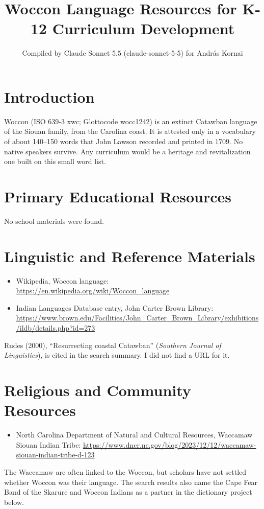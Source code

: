 \documentclass[12pt]{article}
\title{Woccon Language Resources for K-12 Curriculum Development}
\author{Compiled by Claude Sonnet 5.5 (claude-sonnet-5-5) for Andr\'as Kornai}
\date{}
\begin{document}
\maketitle

\section{Introduction}
Woccon (ISO 639-3 xwc; Glottocode wocc1242) is an extinct Catawban language of the Siouan family, from the Carolina coast. It is attested only in a vocabulary of about 140--150 words that John Lawson recorded and printed in 1709. No native speakers survive. Any curriculum would be a heritage and revitalization one built on this small word list.

\section{Primary Educational Resources}
No school materials were found.

\section{Linguistic and Reference Materials}
\begin{itemize}
\item Wikipedia, Woccon language: \url{https://en.wikipedia.org/wiki/Woccon_language}
\item Indian Languages Database entry, John Carter Brown Library: \url{https://www.brown.edu/Facilities/John_Carter_Brown_Library/exhibitions/ildb/details.php?id=273}
\end{itemize}
Rudes (2000), ``Resurrecting coastal Catawban'' (\emph{Southern Journal of Linguistics}), is cited in the search summary. I did not find a URL for it.

\section{Religious and Community Resources}
\begin{itemize}
\item North Carolina Department of Natural and Cultural Resources, Waccamaw Siouan Indian Tribe: \url{https://www.dncr.nc.gov/blog/2023/12/12/waccamaw-siouan-indian-tribe-d-123}
\end{itemize}
The Waccamaw are often linked to the Woccon, but scholars have not settled whether Woccon was their language. The search results also name the Cape Fear Band of the Skarure and Woccon Indians as a partner in the dictionary project below.
\end{document}

